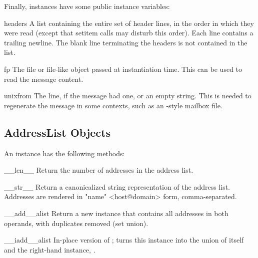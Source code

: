 Finally,  instances have some public instance variables:

\begin{memberdesc}{headers}
A list containing the entire set of header lines, in the order in
which they were read (except that setitem calls may disturb this
order). Each line contains a trailing newline.  The
blank line terminating the headers is not contained in the list.
\end{memberdesc}

\begin{memberdesc}{fp}
The file or file-like object passed at instantiation time.  This can
be used to read the message content.
\end{memberdesc}

\begin{memberdesc}{unixfrom}
The \UNIX{}  line, if the message had one, or an empty
string.  This is needed to regenerate the message in some contexts,
such as an -style mailbox file.
\end{memberdesc}


\subsection{AddressList Objects \label{addresslist-objects}}

An  instance has the following methods:

\begin{methoddesc}{__len__}{}
Return the number of addresses in the address list.
\end{methoddesc}

\begin{methoddesc}{__str__}{}
Return a canonicalized string representation of the address list.
Addresses are rendered in "name" <host@domain> form, comma-separated.
\end{methoddesc}

\begin{methoddesc}{__add__}{alist}
Return a new  instance that contains all addresses
in both  operands, with duplicates removed (set
union).
\end{methoddesc}

\begin{methoddesc}{__iadd__}{alist}
In-place version of ; turns this 
instance into the union of itself and the right-hand instance,
.
\end{methoddesc}

